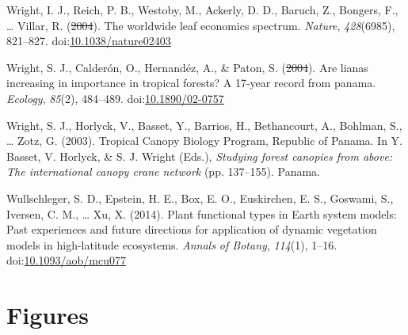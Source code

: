 \documentclass[12pt,]{article}
\theoremstyle{definition}
\theoremstyle{definition}
\theoremstyle{definition}
\theoremstyle{remark}
\providecommand{\DIFaddtex}[1]{{\protect\color{blue}\uwave{#1}}} %
\providecommand{\DIFdeltex}[1]{{\protect\color{red}\sout{#1}}}                      %
\providecommand{\DIFaddbegin}{} %
\providecommand{\DIFaddend}{} %
\providecommand{\DIFdelbegin}{} %
\providecommand{\DIFdelend}{} %
\providecommand{\DIFadd}[1]{\texorpdfstring{\DIFaddtex{#1}}{#1}} %
\providecommand{\DIFdel}[1]{\texorpdfstring{\DIFdeltex{#1}}{}} %
\newcommand{\DIFscaledelfig}{0.5}
\newlength{\DIFdelgraphicswidth} %
\newlength{\DIFdelgraphicsheight} %
\newcommand{\DIFaddincludegraphics}[2][]{{\color{blue}\fbox{\DIFOincludegraphics[#1]{#2}}}} %
\newcommand{\DIFdelincludegraphics}[2][]{%
\sbox{\DIFdelgraphicsbox}{\DIFOincludegraphics[#1]{#2}}%
\settoboxwidth{\DIFdelgraphicswidth}{\DIFdelgraphicsbox} %
\settoboxtotalheight{\DIFdelgraphicsheight}{\DIFdelgraphicsbox} %
\scalebox{\DIFscaledelfig}{%
\parbox[b]{\DIFdelgraphicswidth}{\usebox{\DIFdelgraphicsbox}\\[-\baselineskip] \rule{\DIFdelgraphicswidth}{0em}}\llap{\resizebox{\DIFdelgraphicswidth}{\DIFdelgraphicsheight}{%
\setlength{\unitlength}{\DIFdelgraphicswidth}%
\begin{picture}(1,1)%
\thicklines\linethickness{2pt} %
{\color[rgb]{1,0,0}\put(0,0){\framebox(1,1){}}}%
{\color[rgb]{1,0,0}\put(0,0){\line( 1,1){1}}}%
{\color[rgb]{1,0,0}\put(0,1){\line(1,-1){1}}}%
\end{picture}%
}\hspace*{3pt}}} %
} %
\DeclareRobustCommand{\DIFaddbegin}{\DIFOaddbegin \let\includegraphics\DIFaddincludegraphics} %
\DeclareRobustCommand{\DIFaddend}{\DIFOaddend \let\includegraphics\DIFOincludegraphics} %
\DeclareRobustCommand{\DIFdelbegin}{\DIFOdelbegin \let\includegraphics\DIFdelincludegraphics} %
\DeclareRobustCommand{\DIFdelend}{\DIFOaddend \let\includegraphics\DIFOincludegraphics} %
\begin{document}
\begin{itemize}
\leavevmode\hypertarget{ref-Wright2004a}{}%
Wright, I. J., Reich, P. B., Westoby, M., Ackerly, D. D., Baruch, Z.,
Bongers, F., \ldots{} Villar, R. (\DIFdelbegin \DIFdel{2004}\DIFdelend \DIFaddbegin \DIFadd{2004a}\DIFaddend ). The worldwide leaf economics
spectrum. \emph{Nature}, \emph{428}(6985), 821--827.
doi:\href{https://doi.org/10.1038/nature02403}{10.1038/nature02403}

\leavevmode\hypertarget{ref-Wright2004}{}%
Wright, S. J., Calderón, O., Hernandéz, A., \& Paton, S. (\DIFdelbegin \DIFdel{2004}\DIFdelend \DIFaddbegin \DIFadd{2004b}\DIFaddend ). Are
lianas increasing in importance in tropical forests? A 17-year record
from panama. \emph{Ecology}, \emph{85}(2), 484--489.
doi:\href{https://doi.org/10.1890/02-0757}{10.1890/02-0757}

\leavevmode\hypertarget{ref-Wright2003}{}%
Wright, S. J., Horlyck, V., Basset, Y., Barrios, H., Bethancourt, A.,
Bohlman, S., \ldots{} Zotz, G. (2003). Tropical Canopy Biology Program,
Republic of Panama. In Y. Basset, V. Horlyck, \& S. J. Wright (Eds.),
\emph{Studying forest canopies from above: The international canopy
crane network} (pp. 137--155). Panama.

\leavevmode\hypertarget{ref-Wullschleger2014}{}%
Wullschleger, S. D., Epstein, H. E., Box, E. O., Euskirchen, E. S.,
Goswami, S., Iversen, C. M., \ldots{} Xu, X. (2014). Plant functional
types in Earth system models: Past experiences and future directions for
application of dynamic vegetation models in high-latitude ecosystems.
\emph{Annals of Botany}, \emph{114}(1), 1--16.
doi:\href{https://doi.org/10.1093/aob/mcu077}{10.1093/aob/mcu077}
\DIFaddbegin

\newpage

\hypertarget{figures}{%
\section{Figures}\label{figures}}


\end{itemize}
\end{document}
